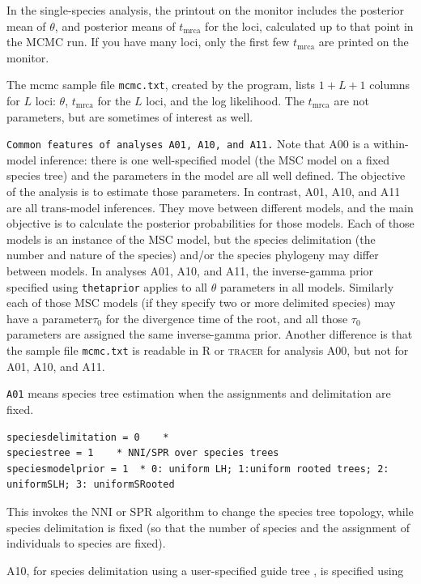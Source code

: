 \documentclass{book}
\numberwithin{equation}{section} \renewcommand{\baselinestretch}{0.55}
\begin{document}
\newpage
In the single-species analysis, the printout on the monitor includes
the posterior mean of $\theta$, and posterior means of
$t_{\mathrm{mrca}}$ for the loci, calculated up to that point in the
MCMC run.  If you have many loci, only the first few
$t_{\mathrm{mrca}}$ are printed on the monitor.

The mcmc sample file \texttt{mcmc.txt}, created by the program, lists $1 + L + 1$ columns for $L$ loci: $\theta$,
$t_{\mathrm{mrca}}$ for the $L$ loci, and the log likelihood.  The
$t_{\mathrm{mrca}}$ are not parameters, but are sometimes of interest
as well.

\texttt{Common features of analyses A01, A10, and A11.}  Note that A00
is a within-model inference: there is one well-specified model (the
MSC model on a fixed species tree) and the parameters in the model are
all well defined.  The objective of the analysis is to estimate those
parameters.  In contrast, A01, A10, and A11 are all trans-model
inferences. They move between different models, and the main objective
is to calculate the posterior probabilities for those models.  Each of
those models is an instance of the MSC model, but the species
delimitation (the number and nature of the species) and/or the species
phylogeny may differ between models.  In analyses A01, A10, and A11,
the inverse-gamma prior specified using \texttt{thetaprior} applies to
all $\theta$ parameters in all models.  Similarly each of those MSC
models (if they specify two or more delimited species) may have a
parameter$\tau_0$ for the divergence time of the root, and all those
$\tau_0$ parameters are assigned the same inverse-gamma prior. Another
difference is that the sample file \texttt{mcmc.txt} is readable in R
or \textsc{tracer} for analysis A00, but not for A01, A10, and A11.

\texttt{A01} means species tree estimation when the assignments and
delimitation are fixed.
\begin{verbatim}
speciesdelimitation = 0    *
speciestree = 1    * NNI/SPR over species trees
speciesmodelprior = 1  * 0: uniform LH; 1:uniform rooted trees; 2: uniformSLH; 3: uniformSRooted
\end{verbatim}

This invokes the NNI or SPR algorithm to change the species tree
topology, while species delimitation is fixed (so that the number of
species and the assignment of individuals to species are fixed).

A10, for species delimitation using a user-specified guide tree
\citep{Yang2010, Rannala2013}, is specified using
\end{document}
